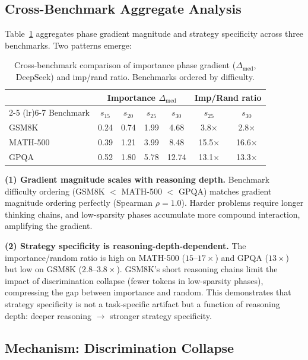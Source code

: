 \documentclass[11pt,a4paper]{article}
\begin{document}
\subsection{Cross-Benchmark Aggregate Analysis}
\label{sec:cross_benchmark}

Table~\ref{tab:cross_benchmark} aggregates phase gradient magnitude and strategy specificity across three benchmarks.
Two patterns emerge:

\begin{table}[t]
\centering
\small
\caption{Cross-benchmark comparison of importance phase gradient ($\Delta_{\mathrm{med}}$, DeepSeek) and imp/rand ratio. Benchmarks ordered by difficulty.}
\label{tab:cross_benchmark}
\begin{tabular}{@{}lcccccc@{}}
\toprule
& \multicolumn{4}{c}{Importance $\Delta_{\mathrm{med}}$} & \multicolumn{2}{c}{Imp/Rand ratio} \\
\cmidrule(lr){2-5} \cmidrule(lr){6-7}
Benchmark & $s_{15}$ & $s_{20}$ & $s_{25}$ & $s_{30}$ & $s_{25}$ & $s_{30}$ \\
\midrule
GSM8K & 0.24 & 0.74 & 1.99 & 4.68 & 3.8$\times$ & 2.8$\times$ \\
MATH-500 & 0.39 & 1.21 & 3.99 & 8.48 & 15.5$\times$ & 16.6$\times$ \\
GPQA & 0.52 & 1.80 & 5.78 & 12.74 & 13.1$\times$ & 13.3$\times$ \\
\bottomrule
\end{tabular}
\end{table}

\textbf{(1) Gradient magnitude scales with reasoning depth.}
Benchmark difficulty ordering (GSM8K $<$ MATH-500 $<$ GPQA) matches gradient magnitude ordering perfectly (Spearman $\rho = 1.0$).
Harder problems require longer thinking chains, and low-sparsity phases accumulate more compound interaction, amplifying the gradient.

\textbf{(2) Strategy specificity is reasoning-depth-dependent.}
The importance/random ratio is high on MATH-500 ($15$--$17\times$) and GPQA ($13\times$) but low on GSM8K ($2.8$--$3.8\times$).
GSM8K's short reasoning chains limit the impact of discrimination collapse (fewer tokens in low-sparsity phases), compressing the gap between importance and random.
This demonstrates that strategy specificity is not a task-specific artifact but a function of reasoning depth: deeper reasoning $\to$ stronger strategy specificity.

\subsection{Mechanism: Discrimination Collapse}
\label{sec:mechanism}
\end{document}
